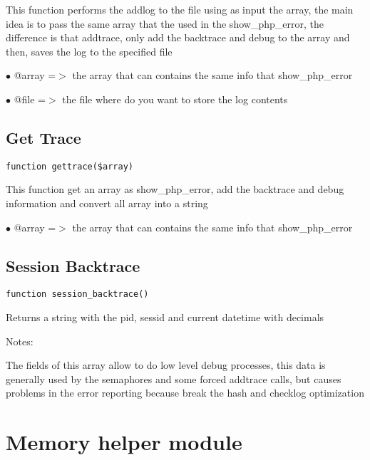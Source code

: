 \documentclass[a4paper]{book}
\begin{document}
This function performs the addlog to the file using as input the array, the
main idea is to pass the same array that the used in the show\_php\_error, the
difference is that addtrace, only add the backtrace and debug to the array
and then, saves the log to the specified file

\begin{compactitem}
\item[\color{myblue}$\bullet$] @array =$>$ the array that can contains the same info that show\_php\_error
\item[\color{myblue}$\bullet$] @file  =$>$ the file where do you want to store the log contents
\end{compactitem}

\hypertarget{toc188}{}
\subsection{Get Trace}

\begin{lstlisting}
function gettrace($array)
\end{lstlisting}

This function get an array as show\_php\_error, add the backtrace and debug
information and convert all array into a string

\begin{compactitem}
\item[\color{myblue}$\bullet$] @array =$>$ the array that can contains the same info that show\_php\_error
\end{compactitem}

\hypertarget{toc189}{}
\subsection{Session Backtrace}

\begin{lstlisting}
function session_backtrace()
\end{lstlisting}

Returns a string with the pid, sessid and current datetime with decimals

Notes:

The fields of this array allow to do low level debug processes, this data is
generally used by the semaphores and some forced addtrace calls, but causes
problems in the error reporting because break the hash and checklog optimization

\hypertarget{toc190}{}
\section{Memory helper module}
\end{document}
